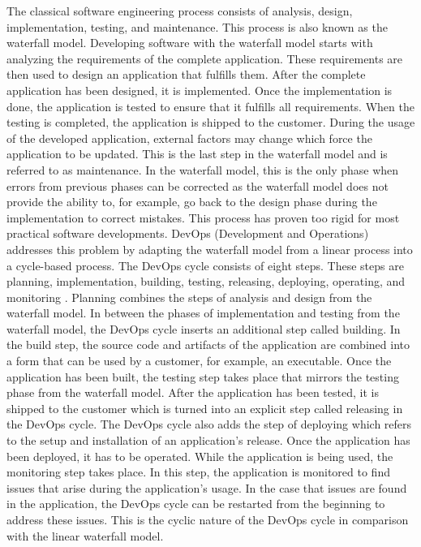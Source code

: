 The classical software engineering process consists of analysis, design, implementation, testing, and maintenance.
This process is also known as the waterfall model. Developing software with the waterfall model starts
with analyzing the requirements of the complete application. These requirements are then used to design
an application that fulfills them. After the complete application has been designed, it is implemented.
Once the implementation is done, the application is tested to ensure that it fulfills all requirements.
When the testing is completed, the application is shipped to the customer. During the usage of the developed application,
external factors may change which force the application to be updated. This is the last step in the waterfall model
and is referred to as maintenance. In the waterfall model, this is the only phase when errors from previous phases can be corrected
as the waterfall model does not provide the ability to, for example, go back to the design phase during the implementation
to correct mistakes. This process has proven too rigid for most practical software developments.
DevOps (Development and Operations) addresses this problem by adapting the waterfall model from a linear process
into a cycle-based process.
The DevOps cycle consists of eight steps. These steps are planning, implementation, building, testing,
releasing, deploying, operating, and monitoring \cite{CM-W-DEV}.
Planning combines the steps of analysis and design from the waterfall model.
In between the phases of implementation and testing from the waterfall model, the DevOps cycle inserts
an additional step called building. In the build step, the source code and artifacts of the application
are combined into a form that can be used by a customer, for example, an executable. Once the application
has been built, the testing step takes place that mirrors the testing phase from the waterfall model.
After the application has been tested, it is shipped to the customer which is turned into an explicit step called releasing
in the DevOps cycle. The DevOps cycle also adds the step of deploying which refers to the setup and installation of an application's release.
Once the application has been deployed, it has to be operated. %
While the application is being used, the monitoring step takes place. In this step,
the application is monitored to find issues that arise during the application's usage.
In the case that issues are found in the application, the DevOps cycle can be restarted from the beginning
to address these issues. This is the cyclic nature of the DevOps cycle in comparison with the linear waterfall model.

